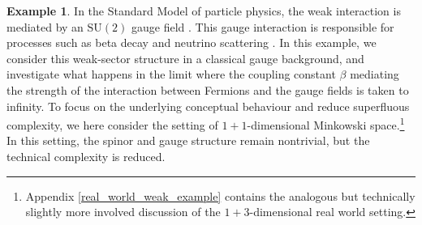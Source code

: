 \documentclass[reqno,12pt,letterpaper]{amsart}
\numberwithin{equation}{section}
\newcommand{\1}{\mathds{1}}
\theoremstyle{definition}
\newtheorem{Ex}[Th]{Example}
\begin{document}
\begin{Ex}\label{weak_interaction_example}
	In the Standard Model of particle physics, the weak interaction is mediated by an \(\mathrm{SU}(2)\) gauge field
	 \cite{peskin1995introduction, hamilton2017mathematical}. This gauge interaction is responsible for processes such as beta decay and neutrino scattering \cite{Bettini2014, srednicki2007quantum}. In this example, we consider this weak-sector structure in a classical gauge background, and investigate what happens in the limit where the coupling constant $\beta$ mediating the strength of the interaction between Fermions and the gauge fields is taken to infinity.
	   To focus on the underlying conceptual behaviour and reduce superfluous complexity, we here consider the setting of \(1+1\)-dimensional Minkowski space.\footnote{Appendix \ref{real_world_weak_example} contains the analogous but technically slightly more involved discussion of the $1+3$-dimensional real world setting.} In this setting, the spinor and gauge structure remain nontrivial, but the technical complexity is reduced.
	

\end{Ex}
\end{document}
